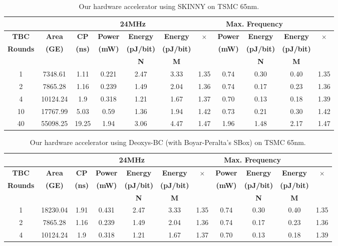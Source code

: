 \documentclass[conference]{IEEEtran}
\begin{document}
\begin{table}
  \centering
  \caption{Our hardware accelerator using SKINNY on TSMC 65nm.}\label{tab:acc65nm}
  \begin{tabular}{c|c|c|c|c|c|c|c|c|c|c}\hline
    \multicolumn{2}{c|}{}&\multicolumn{4}{c|}{\textbf{24MHz}}&\multicolumn{4}{c}{\textbf{Max. Frequency}} \\ \hline
    \textbf{TBC} & \textbf{Area} & \textbf{CP} & \textbf{Power} & \textbf{Energy} & \textbf{Energy} & \multirow{2}{*}{\textbf{$\times$}} & \textbf{Power} & \textbf{Energy} & \textbf{Energy} & \multirow{2}{*}{\textbf{$\times$}} \\ 
    \textbf{Rounds} & \textbf{(GE)} & \textbf{(ns)} & \textbf{(mW)} & \textbf{(pJ/bit)} &  \textbf{(pJ/bit)} &  & \textbf{(mW)} & \textbf{(pJ/bit)} &  \textbf{(pJ/bit)}  & \\
    & & & & \textbf{N} & \textbf{M} & & & \textbf{N} & \textbf{M} & \\ \hline \hline
    1  & 7348.61   & 1.11	  & 0.221   & 2.47	& 3.33 & 1.35 & 0.74 & 0.30 & 0.40 & 1.35 \\ 
    2	 & 7865.28	 & 1.16		& 0.239		& 1.49	& 2.04 & 1.36 & 0.74 & 0.17 & 0.23 & 1.36 \\ 
    4	 & 10124.24	 & 1.9		& 0.318		& 1.21	& 1.67 & 1.37 & 0.70 & 0.13 & 0.18 & 1.39 \\ 
    10 & 17767.99	 & 5.03		& 0.59		& 1.36	& 1.94 & 1.42 & 0.73 & 0.21 & 0.30 & 1.42 \\ 
    40 & 55098.25	 & 19.25	& 1.94		& 3.06	& 4.47 & 1.47 & 1.96 & 1.48 & 2.17 & 1.47 \\ \hline 
  \end{tabular}
\end{table}

\begin{table}
  \centering
  \caption{Our hardware accelerator using Deoxys-BC (with Boyar-Peralta's SBox) on TSMC 65nm.}\label{tab:acc65nm}
  \begin{tabular}{c|c|c|c|c|c|c|c|c|c|c}\hline
    \multicolumn{2}{c|}{}&\multicolumn{4}{c|}{\textbf{24MHz}}&\multicolumn{4}{c}{\textbf{Max. Frequency}} \\ \hline
    \textbf{TBC} & \textbf{Area} & \textbf{CP} & \textbf{Power} & \textbf{Energy} & \textbf{Energy} & \multirow{2}{*}{\textbf{$\times$}} & \textbf{Power} & \textbf{Energy} & \textbf{Energy} & \multirow{2}{*}{\textbf{$\times$}} \\ 
    \textbf{Rounds} & \textbf{(GE)} & \textbf{(ns)} & \textbf{(mW)} & \textbf{(pJ/bit)} &  \textbf{(pJ/bit)} &  & \textbf{(mW)} & \textbf{(pJ/bit)} &  \textbf{(pJ/bit)}  & \\
    & & & & \textbf{N} & \textbf{M} & & & \textbf{N} & \textbf{M} & \\ \hline \hline
    1  & 18230.04  & 1.91	  & 0.431   & 2.47	& 3.33 & 1.35 & 0.74 & 0.30 & 0.40 & 1.35 \\ 
    2	 & 7865.28	 & 1.16		& 0.239		& 1.49	& 2.04 & 1.36 & 0.74 & 0.17 & 0.23 & 1.36 \\ 
    4	 & 10124.24	 & 1.9		& 0.318		& 1.21	& 1.67 & 1.37 & 0.70 & 0.13 & 0.18 & 1.39 \\ \hline
  \end{tabular}
\end{table}
\end{document}
